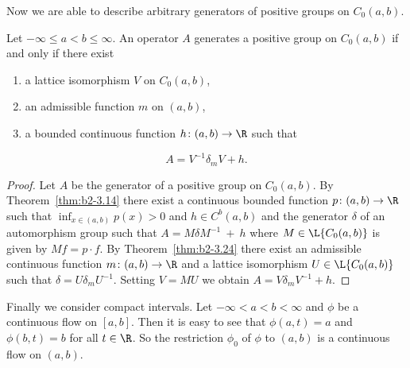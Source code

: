Now we are able to describe arbitrary generators of positive groups on $C_{0}(a,b)$.
\begin{theorem}\label{thm:b2-3.25}
%
Let $-\infty \leq a < b \leq \infty$.
An operator $A$ generates a positive group on $C_{0}(a,b)$ if and only if there exist
\begin{enumerate}[\upshape (i)]
\item 
a lattice isomorphism $V$ on $C_{0}(a,b)$,
\item 
an admissible function $m$ on $(a,b)$,
\item 
a bounded continuous function $h \colon (a,b) \to \R$ such that
\end{enumerate}
\begin{equation}\label{eq:b2-3.24}
A = V^{-1}\delta_{m}V + h.
\end{equation}
\end{theorem}
\begin{proof}
Let $A$ be the generator of a positive group on $C_{0}(a,b)$.
By Theorem~\ref{thm:b2-3.14} 
there exist a continuous bounded function $p \colon (a,b) \to \R$ such that $\inf_{x \in (a,b)} p(x) > 0$ and $h \in C^{b}(a,b)$ 
and the generator $\delta$ of an automorphism group such that $A = M\delta M^{-1}~+~h$ 
where $M \in \L{C_{0}(a,b)}$ is given by $Mf = p \cdot f$.
By Theorem~\ref{thm:b2-3.24} there exist an admissible continuous function $m \colon (a,b) \to \R$ and a lattice isomorphism $U \in \L{C_{0}(a,b)}$ such that $\delta = U\delta_{m}U^{-1}$.
Setting $V = MU$ we obtain $A = V\delta_{m}V^{-1} + h$.
\end{proof}
Finally we consider compact intervals.
Let $-\infty < a < b < \infty$ and $\phi$ be a continuous flow on $[a,b]$.
Then it is easy to see that $\phi(a,t) = a$ and $\phi(b,t) = b$ for all $t \in \R$.
So the restriction $\phi_{0}$ of\/ $\phi$ to $(a,b)$ is a continuous flow on $(a,b)$.


